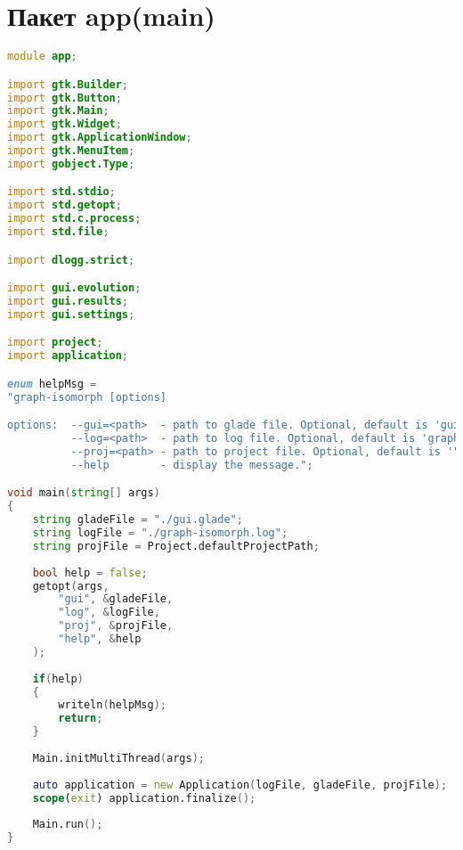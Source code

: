 \documentclass[russian,utf8,emptystyle]{eskdtext}
\begin{document}
\maketitle
\tableofcontents
\newpage

\section{Пакет app(main)}

\begin{lstlisting}[language=D]
module app;

import gtk.Builder;
import gtk.Button;
import gtk.Main;
import gtk.Widget;
import gtk.ApplicationWindow;
import gtk.MenuItem;
import gobject.Type;

import std.stdio;
import std.getopt;
import std.c.process;
import std.file;

import dlogg.strict;

import gui.evolution;
import gui.results;
import gui.settings;

import project;
import application;

enum helpMsg = 
"graph-isomorph [options]

options:  --gui=<path>  - path to glade file. Optional, default is 'gui.glade'.
          --log=<path>  - path to log file. Optional, default is 'graph-isomorph.log'.
          --proj=<path> - path to project file. Optional, default is '"~Project.defaultProjectPath~"'. 
          --help        - display the message.";

void main(string[] args)
{
	string gladeFile = "./gui.glade";
	string logFile = "./graph-isomorph.log";
	string projFile = Project.defaultProjectPath;
	
	bool help = false;
	getopt(args,
	    "gui", &gladeFile,
	    "log", &logFile,
	    "proj", &projFile,
	    "help", &help
	);
	
	if(help)
	{
	    writeln(helpMsg);
	    return;
	}
	
	Main.initMultiThread(args);
	
	auto application = new Application(logFile, gladeFile, projFile);
	scope(exit) application.finalize();
    
	Main.run();
}
\end{lstlisting}
\end{document}
